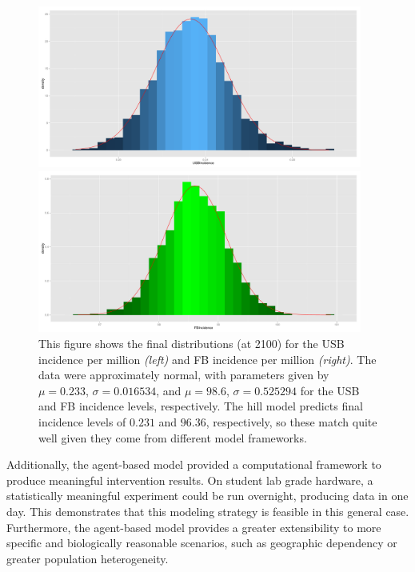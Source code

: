 \documentclass{amsart}
\renewcommand{\(}{\left(}
\renewcommand{\)}{\right)}
\begin{document}
\begin{figure}[h]
  \centering
  \begin{minipage}{0.45\textwidth}
    \includegraphics[width=0.95\textwidth]{figures/IN0distOrig}
  \end{minipage}
  \begin{minipage}{0.45\textwidth}
    \includegraphics[width=0.95\textwidth]{figures/IN1distOrig}
  \end{minipage}
  \caption{This figure shows the final distributions (at 2100) for the USB
    incidence per million \textit{(left)} and FB incidence per million
    \textit{(right)}. The data were approximately normal, with parameters given
    by $\mu = 0.233$, $\sigma = 0.016534$, and $\mu = 98.6$, $\sigma = 0.525294$
    for the USB and FB incidence levels, respectively. The hill model predicts
    final incidence levels of $0.231$ and $96.36$, respectively, so these match
    quite well given they come from different model frameworks.
  }
  \label{fig:finalDists}
\end{figure}

Additionally, the agent-based model provided a computational
framework to produce meaningful intervention results. On student lab grade
hardware, a statistically meaningful experiment could be run overnight,
producing data in one day. This demonstrates that this modeling strategy is
feasible in this general case.  Furthermore, the agent-based model provides a
greater extensibility to more specific and biologically reasonable scenarios,
such as geographic dependency or greater population heterogeneity.  
\end{document}
